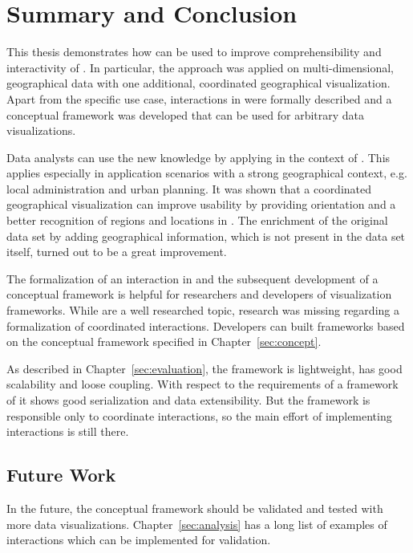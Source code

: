 \chapter{Summary and Conclusion}\label{sec:conclusion}

This thesis demonstrates how \cmvs{} can be used to improve comprehensibility and interactivity of \tmaps{}.
In particular, the approach was applied on multi-dimensional, geographical data with one additional, coordinated geographical visualization.
Apart from the specific use case, interactions in \cmvs{} were formally described and a conceptual framework was developed that can be used for arbitrary data visualizations.

Data analysts can use the new knowledge by applying \tmaps{} in the context of \dss{}.
This applies especially in application scenarios with a strong geographical context, e.g. local administration and urban planning.
It was shown that a coordinated geographical visualization can improve usability by providing orientation and a better recognition of regions and locations in \tmaps{}.
The enrichment of the original data set by adding geographical information, which is not present in the data set itself, turned out to be a great improvement.

The formalization of an interaction in \cmvs{} and the subsequent development of a conceptual framework is helpful for researchers and developers of visualization frameworks.
While \cmvs{} are a well researched topic, research was missing regarding a formalization of coordinated interactions.
Developers can built frameworks based on the conceptual framework specified in Chapter~\ref{sec:concept}.

As described in Chapter~\ref{sec:evaluation}, the framework is lightweight, has good scalability and loose coupling.
With respect to the requirements of a framework of \cmvs{} it shows good serialization and data extensibility.
But the framework is responsible only to coordinate interactions, so the main effort of implementing interactions is still there.

\section{Future Work}

In the future, the conceptual framework should be validated and tested with more data visualizations.
Chapter~\ref{sec:analysis} has a long list of examples of interactions which can be implemented for validation.


